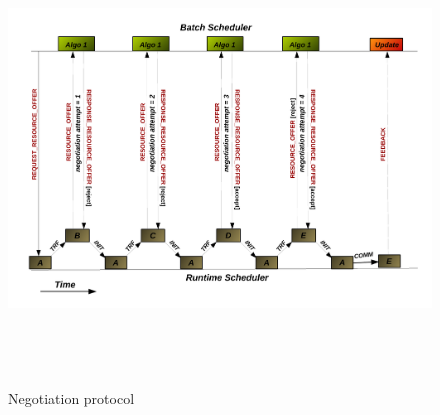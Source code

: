 \begin{figure}[!htbp]
\hspace*{-0.5in}
\includegraphics[width=1.2\textwidth, height=120mm]{./figures/negotiation.pdf}
\caption{Negotiation protocol}
\label{fig:2}
\end{figure}
